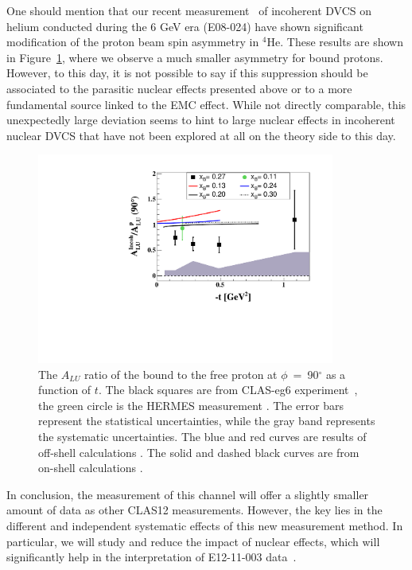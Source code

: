 One should mention that our recent 
measurement~\cite{Hattawy:2018liu} of incoherent DVCS on helium conducted during the 6 
GeV era (E08-024) have shown significant modification of the proton beam 
spin asymmetry in $^4$He. These results are shown in 
Figure~\ref{fig:incoh_EMC_ratio_ALU_proton}, where we observe a much smaller asymmetry for 
bound protons. However, to this day, it is not possible to say if this suppression should
be associated to the parasitic
nuclear effects presented above or to a more fundamental source linked to the EMC effect. 
While not directly comparable, this unexpectedly large deviation seems to hint to large
nuclear effects in incoherent nuclear DVCS that have not been explored at all on the theory 
side to this day.

\begin{figure}[tb]
\centering
\includegraphics[width=9.8cm]{figures/ALU_ratioInc_t_shortscenrario-without-error-onX.pdf}
\caption{ The $A_{LU}$ ratio of the bound to the free proton at 
   $\phi$~=~90$^{\circ}$ as a function of $t$. The black squares are from 
   CLAS-eg6 experiment~\cite{Hattawy:2018liu}, the green circle is the HERMES 
   measurement \cite{Airapetian:2009cga}.  The error bars represent the 
   statistical uncertainties, while the gray band represents the systematic 
   uncertainties. The blue and red curves are results of off-shell calculations 
   \cite{Liuti:2005gi}. The solid and dashed black curves are from on-shell 
   calculations \cite{Guzey:2008fe}.} \label{fig:incoh_EMC_ratio_ALU_proton}
\end{figure}

In conclusion, the measurement of this channel will offer a slightly smaller amount of 
data as other CLAS12 measurements. However, the key lies in the different and 
independent systematic effects of this new measurement method. In 
particular, we will study and reduce the impact of nuclear effects, which will 
significantly help in the interpretation of E12-11-003 
data~\cite{neutronDVCS}. 

